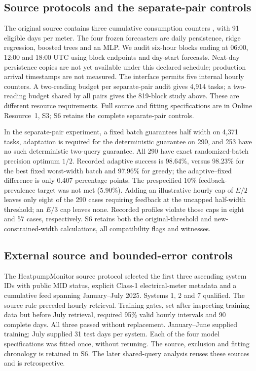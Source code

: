 \subsection{Source protocols and the separate-pair controls}
\label{sec:counter-precision-results}
The original source contains three cumulative consumption counters
\citep{blem}, with 91 eligible days per meter. The four frozen forecasters
are daily persistence, ridge regression, boosted trees and an MLP. We audit
six-hour blocks ending at 06:00, 12:00 and 18:00 UTC using block endpoints
and day-start forecasts. Next-day persistence copies are not yet available
under this declared schedule; production arrival timestamps are not measured.
The interface permits five internal hourly counters. A two-reading budget
per separate-pair audit gives 4,914 tasks; a two-reading budget shared by
all pairs gives the 819-block study above. These are different resource
requirements. Full source and fitting specifications are in Online
Resource~1, S3; S6 retains the complete separate-pair controls.

In the separate-pair experiment, a fixed batch guarantees half width on
4,371 tasks, adaptation is required for the deterministic guarantee on 290,
and 253 have no such deterministic two-query guarantee. All 290 have exact
randomized-batch precision optimum $1/2$. Recorded adaptive success is
98.64\%, versus 98.23\% for the best fixed worst-width batch and 97.96\% for
greedy; the adaptive--fixed difference is only 0.407 percentage points.
The prespecified 10\% feedback-prevalence target was not met (5.90\%).
Adding an illustrative hourly cap of $E/2$ leaves only eight of the 290
cases requiring feedback at the uncapped half-width threshold; an $E/3$
cap leaves none. Recorded profiles violate those caps in eight and 57
cases, respectively. S6 retains both the original-threshold and
new-constrained-width calculations, all compatibility flags and witnesses.

\subsection{External source and bounded-error controls}
\label{sec:external-hpm}
The HeatpumpMonitor source protocol \citep{hpmabout,hpmapi} selected the
first three ascending system IDs with public MID status, explicit Class-1
electrical-meter metadata and a cumulative feed spanning January--July
2025. Systems 1, 2 and 7 qualified. The source rule preceded hourly
retrieval. Training gates, set after inspecting training data but before
July retrieval, required 95\% valid hourly intervals and 90 complete days.
All three passed without replacement. January--June supplied training;
July supplied 31 test days per system. Each of the four model specifications
was fitted once, without retuning. The source, exclusion and fitting
chronology is retained in S6. The later shared-query analysis reuses these
sources and is retrospective.

